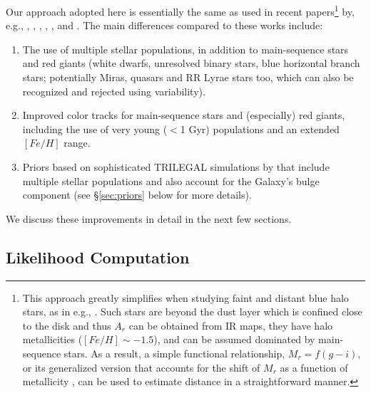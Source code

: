Our approach adopted here is essentially the same as used in recent papers\footnote{This approach greatly simplifies when studying
faint and distant blue halo stars, as in e.g., \cite{2008ApJ...673..864J}. Such stars are beyond the dust layer which is confined close
to the disk and thus $A_r$ can be obtained from IR maps, they have halo metallicities ($[Fe/H] \sim -1.5$), and can be assumed dominated
by main-sequence stars. As a result, a simple functional relationship, $M_r = f(g-i)$, or its generalized version that
accounts for the shift of $M_r$ as a function of metallicity \citep{2008ApJ...684..287I}, can be used to estimate distance
in a straightforward manner.}
by, e.g., \cite{2011MNRAS.411..435B},  \cite{2014ApJ...783..114G}, \cite{lallement_3d_2014}, 
\cite{gordon_panchromatic_2016}, \cite{queiroz_starhorse_2018}, \cite{green_3d_2019} and \cite{bailer-jones_estimating_2021}.
The main differences compared to these works include: 
\begin{enumerate}
\item The use of multiple stellar populations, in addition to main-sequence stars and red giants (white dwarfs, unresolved binary stars,
                blue horizontal branch stars; potentially Miras, quasars and RR Lyrae stars too, which can also be recognized and rejected using variability).
\item Improved color tracks for main-sequence stars and (especially) red giants, including the use of very young ($<$1 Gyr) populations 
               and an extended $[Fe/H]$ range. 
\item Priors based on sophisticated TRILEGAL simulations by \cite{2022ApJS..262...22D} that include multiple stellar populations and
               also account for the Galaxy's bulge component (see
               \S\ref{sec:priors} below for more details). 
\end{enumerate}
             
We discuss these improvements in detail in the next few sections. 


\subsection{Likelihood Computation}

